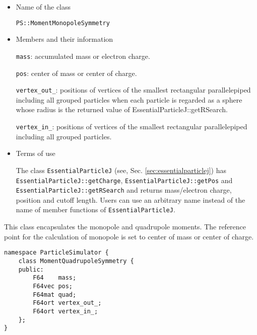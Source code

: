 \begin{itemize}
\item Name of the class
        
  \texttt{PS::MomentMonopoleSymmetry}

\item Members and their information

  \texttt{mass}: accumulated mass or electron charge.

  \texttt{pos}: center of mass or center of charge.
        
  \texttt{vertex\_out\_}: positions of vertices of the smallest rectangular parallelepiped including all grouped particles when each particle is regarded as a sphere whose radius is the returned value of EssentialParticleJ::getRSearch.
  
  \texttt{vertex\_in\_}: positions of vertices of the smallest rectangular parallelepiped including all grouped particles.

\item Terms of use

  The class \texttt{EssentialParticleJ} (see, Sec. \ref{sec:essentialparticlej}) has \texttt{EssentialParticleJ::getCharge}, \texttt{EssentialParticleJ::getPos} and \texttt{EssentialParticleJ::getRSearch} and returns mass/electron charge, position and cutoff length. Users can use an arbitrary name instead of the name of member functions of \texttt{EssentialParticleJ}.

\end{itemize}

\label{sec:MomentQuadrupoleSymmetry}

This class encapsulates the monopole and quadrupole moments. The reference point for the calculation of monopole is set to center of mass or center of charge.

\begin{screen}
\begin{verbatim}
namespace ParticleSimulator {
    class MomentQuadrupoleSymmetry {
    public:
        F64    mass;
        F64vec pos;
        F64mat quad;
        F64ort vertex_out_;
        F64ort vertex_in_;
    };
}
\end{verbatim}
\end{screen}

